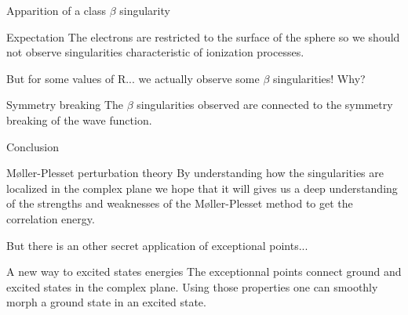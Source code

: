 \documentclass[xcolor=x11names,compress]{beamer}
\renewcommand{\(}{\begin{columns}}
\renewcommand{\)}{\end{columns}}
\newcommand{\<}[1]{\begin{column}{#1}}
\renewcommand{\>}{\end{column}}
\begin{document}
\begin{frame}{Apparition of a class $\beta$ singularity}

\pause[1]

\begin{beamerboxesrounded}[scheme=foncé]{\centering Expectation}
The electrons are restricted to the surface of the sphere so we should not observe singularities characteristic of ionization processes.
\end{beamerboxesrounded}

\vspace{0.5cm}

\pause[2]

\large But for some values of R... we actually observe some $\beta$ singularities!
\centering Why?

\vspace{0.5cm}

\pause[3]

\begin{beamerboxesrounded}[scheme=foncé]{\centering Symmetry breaking}
The $\beta$ singularities observed are connected to the symmetry breaking of the wave function.
\end{beamerboxesrounded}

\end{frame}

\begin{frame}{Conclusion}

\pause[1]

\begin{beamerboxesrounded}[scheme=foncé]{\centering Møller-Plesset perturbation theory}
By understanding how the singularities are localized in the complex plane we hope that it will gives us a deep understanding of the strengths and weaknesses of the Møller-Plesset method to get the correlation energy.
\end{beamerboxesrounded}

\pause[2]

\vspace{0.5cm}

But there is an other secret application of exceptional points...

\pause[3]

\vspace{0.5cm}

\begin{beamerboxesrounded}[scheme=foncé]{\centering A new way to excited states energies}
The exceptionnal points connect ground and excited states in the complex plane. Using those properties one can smoothly morph a ground state in an excited state. 
\end{beamerboxesrounded}
    
\end{frame}
\end{document}
